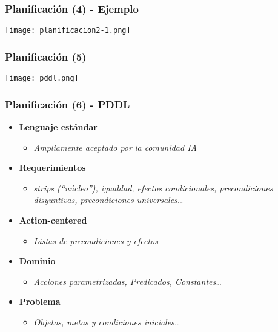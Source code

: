 \documentclass[bigger]{beamer}
\begin{document}
\begin{frame}
\frametitle{Planificación (4) - Ejemplo}
\label{sec-1.5}

\begin{center} \texttt{[image: planificacion2-1.png]} \end{center}
\end{frame}
\begin{frame}
\frametitle{Planificación (5)}
\label{sec-1.6}

\begin{center} \texttt{[image: pddl.png]} \end{center}
\end{frame}
\begin{frame}[<+->]
\frametitle{Planificación (6) - PDDL}
\label{sec-1.7}
\begin{itemize}

\item \textbf{Lenguaje estándar}
\label{sec-1.7.1}%
\begin{itemize}

\item \emph{Ampliamente aceptado por la comunidad IA}\\
\label{sec-1.7.1.1}%
\end{itemize} %

\item \textbf{Requerimientos}
\label{sec-1.7.2}%
\begin{itemize}

\item \emph{strips (``núcleo''), igualdad, efectos condicionales, precondiciones disyuntivas, precondiciones universales\ldots{}}\\
\label{sec-1.7.2.1}%
\end{itemize} %

\item \textbf{Action-centered}
\label{sec-1.7.3}%
\begin{itemize}

\item \emph{Listas de precondiciones y efectos}\\
\label{sec-1.7.3.1}%
\end{itemize} %

\item \textbf{Dominio}
\label{sec-1.7.4}%
\begin{itemize}

\item \emph{Acciones parametrizadas, Predicados, Constantes\ldots{}}\\
\label{sec-1.7.4.1}%
\end{itemize} %

\item \textbf{Problema}
\label{sec-1.7.5}%
\begin{itemize}

\item \emph{Objetos, metas y condiciones iniciales\ldots{}}\\
\label{sec-1.7.5.1}%
\end{itemize} %
\end{itemize} %
\end{frame}
\end{document}
